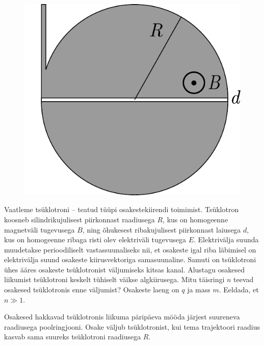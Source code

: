 
\begin{figure}
	\begin{center}
		\includegraphics[width=\linewidth]{2018-v2g-10-tsyklotron}
	\end{center}
\end{figure}

Vaatleme tsüklotroni -- teatud tüüpi osakestekiirendi toimimist. Tsüklotron koosneb silindrikujulisest piirkonnast raadiusega $R$, kus on homogeenne magnetväli tugevusega $B$, ning õhukesest ribakujulisest piirkonnast laiusega $d$, kus on homogeenne ribaga risti olev elektriväli tugevusega $E$. Elektrivälja suunda muudetakse perioodiliselt vastassuunaliseks nii, et osakeste igal riba läbimisel on elektrivälja suund osakeste kiirusvektoriga samasuunaline. Samuti on tsüklotroni ühes ääres osakeste tsüklotronist väljumiseks kitsas kanal. Alustagu osakesed liikumist tsüklotroni keskelt tühiselt väikse algkiirusega. Mitu täisringi $n$ teevad osakesed tsüklotronis enne väljumist? Osakeste laeng on $q$ ja mass $m$. Eeldada, et $n\gg 1.$

\hint
Osakesed hakkavad tsüklotronis liikuma päripäeva mööda järjest suureneva raadiusega poolringjooni. Osake väljub tsüklotronist, kui tema trajektoori raadius kasvab sama suureks tsüklotroni raadiusega $R$.

